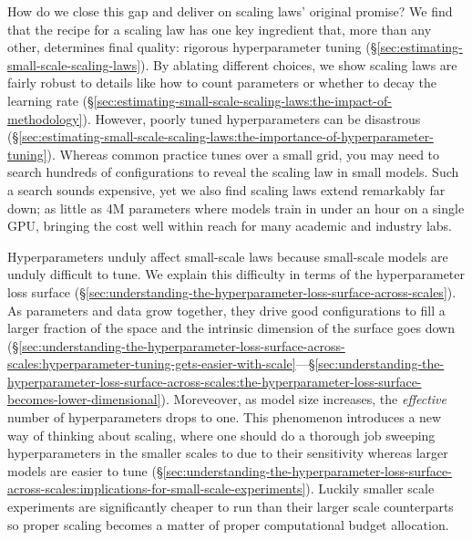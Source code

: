 How do we close this gap and deliver on scaling laws' original promise? We find that the recipe for a scaling law has one key ingredient that, more than any other, determines final quality: rigorous hyperparameter tuning (\S\ref{sec:estimating-small-scale-scaling-laws}). By ablating different choices, we show scaling laws are fairly robust to details like how to count parameters or whether to decay the learning rate (\S\ref{sec:estimating-small-scale-scaling-laws:the-impact-of-methodology}). However, poorly tuned hyperparameters can be disastrous (\S\ref{sec:estimating-small-scale-scaling-laws:the-importance-of-hyperparameter-tuning}). Whereas common practice tunes over a small grid, you may need to search hundreds of configurations to reveal the scaling law in small models. Such a search sounds expensive, yet we also find scaling laws extend remarkably far down; as little as 4M parameters where models train in under an hour on a single GPU, bringing the cost well within reach for many academic and industry labs.

Hyperparameters unduly affect small-scale laws because small-scale models are unduly difficult to tune. We explain this difficulty in terms of the hyperparameter loss surface (\S\ref{sec:understanding-the-hyperparameter-loss-surface-across-scales}). As parameters and data grow together, they drive good configurations to fill a larger fraction of the space and the intrinsic dimension of the surface goes down (\S\ref{sec:understanding-the-hyperparameter-loss-surface-across-scales:hyperparameter-tuning-gets-easier-with-scale}---\S\ref{sec:understanding-the-hyperparameter-loss-surface-across-scales:the-hyperparameter-loss-surface-becomes-lower-dimensional}). Moreveover, as model size increases, the \emph{effective} number of hyperparameters drops to one. This phenomenon introduces a new way of thinking about scaling, where one should do a thorough job sweeping hyperparameters in the smaller scales to due to their sensitivity whereas larger models are easier to tune (\S\ref{sec:understanding-the-hyperparameter-loss-surface-across-scales:implications-for-small-scale-experiments}). Luckily smaller scale experiments are significantly cheaper to run than their larger scale counterparts so proper scaling becomes a matter of proper computational budget allocation. 

